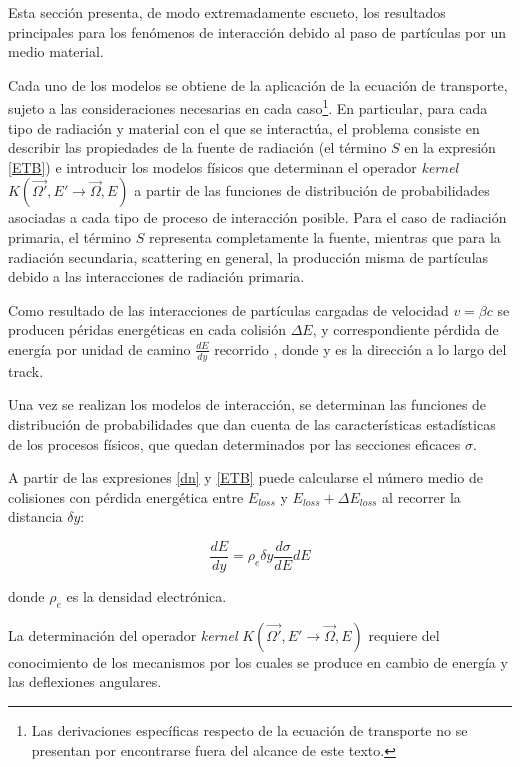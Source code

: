 Esta sección presenta, de modo extremadamente escueto, los resultados principales para los fenómenos de interacción debido al paso de partículas por un medio material.

Cada uno de los modelos se obtiene de la aplicación de la ecuación de transporte, sujeto a las consideraciones necesarias en cada caso\footnote{Las derivaciones específicas respecto de la ecuación de transporte no se presentan por encontrarse fuera del alcance de este texto.}. En particular, para cada tipo de radiación y material con el que se interactúa, el problema consiste en describir las propiedades de la fuente de radiación (el término $S$ en la expresión \ref{ETB}) e introducir los modelos físicos que determinan el operador  \emph{kernel} $K(\vec{\Omega'}, E' \rightarrow \vec{\Omega}, E)$ a partir de las funciones de distribución de probabilidades asociadas a cada tipo de proceso de interacción posible. Para el caso de radiación primaria, el término $S$ representa completamente la fuente, mientras que para la radiación secundaria, scattering en general, la producción misma de partículas debido a las interacciones de radiación primaria.

Como resultado de las interacciones de partículas cargadas de velocidad $v = \beta c$ se producen péridas energéticas en cada colisión $\Delta E$, y correspondiente pérdida de energía por unidad de camino $\frac{dE}{dy}$ recorrido , donde y es la dirección a lo largo del track.

Una vez se realizan los modelos de interacción, se determinan las funciones de distribución de probabilidades que dan cuenta de las características estadísticas de los procesos físicos, que quedan determinados por las secciones eficaces $\sigma$.

A partir de las expresiones \ref{dn} y \ref{ETB} puede calcularse el número medio de colisiones con pérdida energética entre $E_{loss}$ y $E_{loss} + \Delta E_{loss}$ al recorrer la distancia $\delta y$:

\begin{equation}
 \frac{dE}{dy} = \rho_{e} \delta y \frac{d\sigma}{dE} dE
\end{equation}

\noindent
donde $\rho_{e}$ es la densidad electrónica.

La determinación del operador \emph{kernel} $K(\vec{\Omega'}, E' \rightarrow \vec{\Omega}, E)$ requiere del conocimiento de los mecanismos por los cuales se produce en cambio de energía y las deflexiones angulares.


